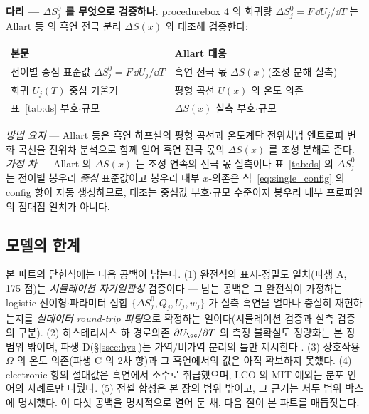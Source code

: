 \begin{srcbox}
\textbf{다리 --- $\Delta S^0_j$ 를 무엇으로 검증하나.} procedurebox 4 의 회귀량 $\Delta S^0_j=F\,\dd
U_j/\dd T$ 는 Allart 등\cite{allart2018} 의 흑연 전극 분리 $\Delta S(x)$ 와 대조해 검증한다:
\begin{center}\footnotesize
\begin{tabular}{@{}ll@{}}
\hline
본문 & Allart\cite{allart2018} 대응 \\
\hline
전이별 중심 표준값 $\Delta S^0_j=F\,\dd U_j/\dd T$ & 흑연 전극 몫 $\Delta S(x)$(조성 분해 실측) \\
회귀 $U_j(T)$ 중심 기울기 & 평형 곡선 $U(x)$ 의 온도 의존 \\
표~\ref{tab:ds} 부호$\cdot$규모 & $\Delta S(x)$ 실측 부호$\cdot$규모 \\
\hline
\end{tabular}
\end{center}
\emph{방법 요지} --- Allart 등은 흑연 하프셀의 평형 곡선과 온도계단 전위차법 엔트로피 변화 곡선을 전위차
분석으로 함께 얻어 흑연 전극 몫의 $\Delta S(x)$ 를 조성 분해로 준다. \emph{가정 차} --- Allart 의 $\Delta S(x)$
는 조성 연속의 전극 몫 실측이나 표~\ref{tab:ds} 의 $\Delta S^0_j$ 는 전이별 봉우리 \emph{중심} 표준값이고
봉우리 내부 $x$-의존은 식~\eqref{eq:single_config} 의 config 항이 자동 생성하므로, 대조는 중심값
부호$\cdot$규모 수준이지 봉우리 내부 프로파일의 점대점 일치가 아니다.
\end{srcbox}

\subsection{모델의 한계}\label{ssec:gaps}
본 파트의 닫힌식에는 다음 공백이 남는다. (1) 완전식의 표시-정밀도 일치(파생 A, 175 점)는 \emph{시뮬레이션
자기일관성} 검증이다 --- 남는 공백은 그 완전식이 가정하는 logistic 전이형$\cdot$파라미터 집합
$\{\Delta S^0_j,Q_j,U_j,w_j\}$ 가 실측 흑연을 얼마나 충실히 재현하는지를 \emph{실데이터 round-trip 피팅}으로
확정하는 일이다(시뮬레이션 검증과 실측 검증의 구분). (2) 히스테리시스 하 경로의존 $\partial U_\oc/\partial T$ 의
측정 불확실도 정량화는 본 장 범위 밖이며, 파생 D(\S\ref{ssec:hys})는 가역/비가역 분리의 틀만 제시한다
\cite{hysteresis2018}. (3) 상호작용 $\Omega$ 의 온도 의존(파생 C 의 2차 항)과 그 흑연에서의 값은 아직
확보하지 못했다. (4) electronic 항의 절대값은 흑연에서 소수로 취급했으며, LCO 의 MIT 예외는 분포 언어의
사례로만 다뤘다. (5) 전셀 합성은 본 장의 범위 밖이고, 그 근거는 서두 범위 박스에 명시했다. 이 다섯 공백을
명시적으로 열어 둔 채, 다음 절이 본 파트를 매듭짓는다.

